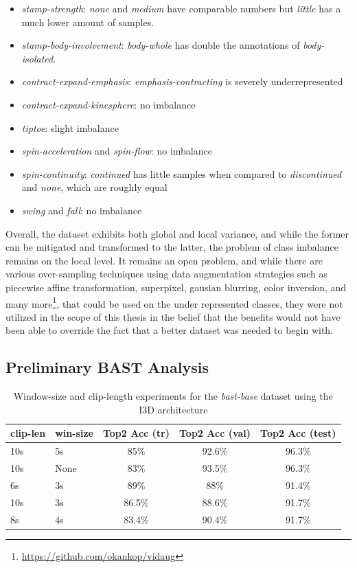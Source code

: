 \documentclass[extern,palatino]{cgMA}
\begin{document}
\begin{itemize}
    \item \textit{stamp-strength}: \textit{none} and \textit{medium} have comparable numbers but \textit{little} has a much lower amount of samples.
    \item \textit{stamp-body-involvement}: \textit{body-whole} has double the annotations of \textit{body-isolated}.
    \item \textit{contract-expand-emphasis}: \textit{emphasis-contracting} is severely underrepresented 
    \item \textit{contract-expand-kinesphere}: no imbalance
    \item \textit{tiptoe}: slight imbalance
    \item \textit{spin-acceleration} and  \textit{spin-flow}: no imbalance
    \item \textit{spin-continuity}: \textit{continued} has little samples when compared to \textit{discontinued} and \textit{none}, which are roughly equal
    \item \textit{swing} and \textit{fall}: no imbalance
\end{itemize}

\noindent Overall, the dataset exhibits both global and local variance, and while the former can be mitigated and transformed to the latter, the problem of class imbalance remains on the local level. It remains an open problem, and while there are various over-sampling techniques using data augmentation strategies such as piecewise affine transformation, superpixel, gausian blurring, color inversion, and many more\footnote{\url{https://github.com/okankop/vidaug}}, that could be used on the under represented classes, they were not utilized in the scope of this thesis in the belief that the benefits would not have been able to override the fact that a better dataset was needed to begin with.

\subsection{Preliminary BAST Analysis}
\label{bast_initial_analysis}
\begin{table}[h!]
  \begin{center}
    \caption{Window-size and clip-length experiments for the \textit{bast-base} dataset using the I3D architecture}
    \label{tab:window_size_clip_length_i3d}
    \begin{tabular}{l|l|c|c|c}
      \textbf{clip-len} & \textbf{win-size} & \textbf{Top2 Acc (tr)} & \textbf{Top2 Acc (val)} & \textbf{Top2 Acc (test)}\\
      \hline
      10s & 5s & 85\% & 92.6\% & 96.3\% \\
      10s & None & 83\% & 93.5\% & 96.3\% \\
      6s & 3s & 89\% & 88\% & 91.4\% \\
      10s & 3s & 86.5\% & 88.6\% & 91.7\% \\
      8s & 4s & 83.4\% & 90.4\% & 91.7\% \\
    \end{tabular}
  \end{center}
\end{table}
\end{document}
